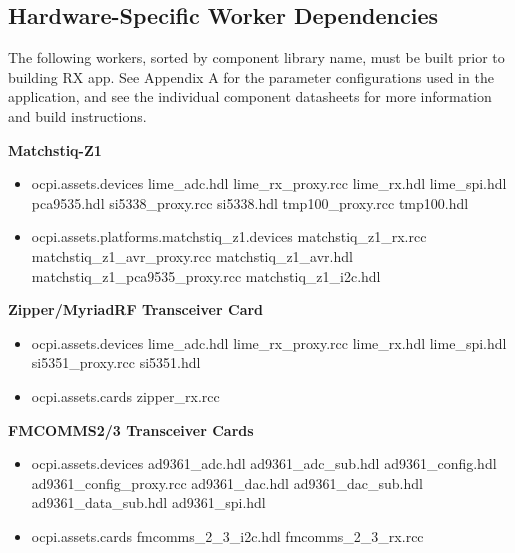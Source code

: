 \subsection{Hardware-Specific Worker Dependencies}
The following workers, sorted by component library name, must be built prior to building RX app. See Appendix A for the parameter configurations used in the application, and see the individual component datasheets for more information and build instructions.\par\bigskip
	\begin{minipage}[t]{.33\textwidth}
	\textbf{Matchstiq-Z1}
	\begin{itemize}
		\item ocpi.assets.devices
			\subitem lime\_adc.hdl
			\subitem lime\_rx\_proxy.rcc
			\subitem lime\_rx.hdl
			\subitem lime\_spi.hdl
			\subitem pca9535.hdl
			\subitem si5338\_proxy.rcc
			\subitem si5338.hdl
			\subitem tmp100\_proxy.rcc
			\subitem tmp100.hdl
		\item ocpi.assets.platforms.matchstiq\_z1.devices
			\subitem matchstiq\_z1\_rx.rcc
			\subitem matchstiq\_z1\_avr\_proxy.rcc
			\subitem matchstiq\_z1\_avr.hdl
			\subitem matchstiq\_z1\_pca9535\_proxy.rcc
			\subitem matchstiq\_z1\_i2c.hdl
	\end{itemize}
	\end{minipage}
	\begin{minipage}[t]{.33\textwidth}
	\textbf{Zipper/MyriadRF Transceiver Card}
	\begin{itemize}
		\item ocpi.assets.devices
			\subitem lime\_adc.hdl
			\subitem lime\_rx\_proxy.rcc
			\subitem lime\_rx.hdl
			\subitem lime\_spi.hdl
			\subitem si5351\_proxy.rcc
			\subitem si5351.hdl
	\end{itemize}
	\begin{itemize}
		\item ocpi.assets.cards
			\subitem zipper\_rx.rcc
	\end{itemize}
	\end{minipage} \medskip
	\begin{minipage}[t]{.33\textwidth}
	\textbf{FMCOMMS2/3 Transceiver Cards}
	\begin{itemize}
		\item ocpi.assets.devices
			\subitem ad9361\_adc.hdl
			\subitem ad9361\_adc\_sub.hdl
			\subitem ad9361\_config.hdl
			\subitem ad9361\_config\_proxy.rcc
			\subitem ad9361\_dac.hdl
			\subitem ad9361\_dac\_sub.hdl
			\subitem ad9361\_data\_sub.hdl
			\subitem ad9361\_spi.hdl
	\end{itemize}
	\begin{itemize}
		\item ocpi.assets.cards
			\subitem fmcomms\_2\_3\_i2c.hdl
			\subitem fmcomms\_2\_3\_rx.rcc
	\end{itemize}

	\end{minipage} \medskip



